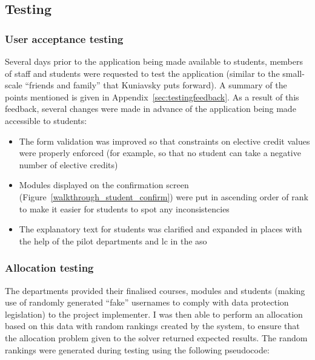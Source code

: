 
\subsection{Testing}

\subsubsection{User acceptance testing}

Several days prior to the application being made available to students,
members of staff and students were requested to test the application (similar
to the small-scale ``friends and family'' that Kuniavsky
\cite{kuniavsky2003userexperience} puts forward). A summary of the points
mentioned is given in Appendix~\ref{sec:testingfeedback}. As a result of this
feedback, several changes were made in advance of the application being made
accessible to students:

\begin{itemize}
  \item The form validation was improved so that constraints on elective
        credit values were properly enforced (for example, so that no student can
        take a negative number of elective credits)
  \item Modules displayed on the confirmation screen
        (Figure~\ref{walkthrough_student_confirm}) were put in ascending order of
        rank to make it easier for students to spot any inconsistencies
  \item The explanatory text for students was clarified and expanded in places
        with the help of the pilot departments and \gls{lc} in the \gls{aso}
\end{itemize}

\subsubsection{Allocation testing}

The departments provided their finalised courses, modules and students (making
use of randomly generated ``fake'' usernames to comply with data protection
legislation) to the project implementer. I was then able to perform an
allocation based on this data with random rankings created by the system, to
ensure that the allocation problem given to the solver returned expected
results. The random rankings were generated during testing using the following
pseudocode:\mynobreakpar

